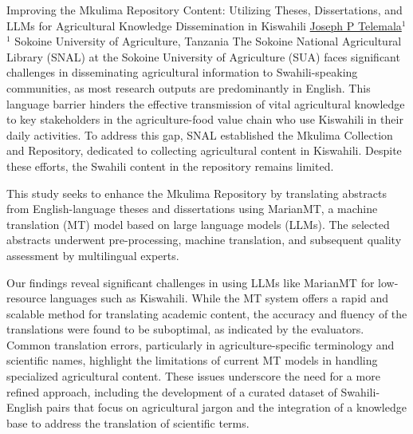 
    \begin{abstract_online}{Improving the Mkulima Repository Content: Utilizing Theses, Dissertations, and LLMs for Agricultural Knowledge Dissemination in Kiswahili}{%
        \underline{Joseph P Telemala}$^{1}${%
        }{%
        $^1$ Sokoine University of Agriculture, Tanzania}
            }
        The Sokoine National Agricultural Library (SNAL) at the Sokoine University of Agriculture (SUA) faces significant challenges in disseminating agricultural information to Swahili-speaking communities, as most research outputs are predominantly in English. This language barrier hinders the effective transmission of vital agricultural knowledge to key stakeholders in the agriculture-food value chain who use Kiswahili in their daily activities. To address this gap, SNAL established the Mkulima Collection and Repository, dedicated to collecting agricultural content in Kiswahili. Despite these efforts, the Swahili content in the repository remains limited.

        This study seeks to enhance the Mkulima Repository by translating abstracts from English-language theses and dissertations using MarianMT, a machine translation (MT) model based on large language models (LLMs). The selected abstracts underwent pre-processing, machine translation, and subsequent quality assessment by multilingual experts.

        Our findings reveal significant challenges in using LLMs like MarianMT for low-resource languages such as Kiswahili. While the MT system offers a rapid and scalable method for translating academic content, the accuracy and fluency of the translations were found to be suboptimal, as indicated by the evaluators. Common translation errors, particularly in agriculture-specific terminology and scientific names, highlight the limitations of current MT models in handling specialized agricultural content. These issues underscore the need for a more refined approach, including the development of a curated dataset of Swahili-English pairs that focus on agricultural jargon and the integration of a knowledge base to address the translation of scientific terms.
    
    \end{abstract_online}
